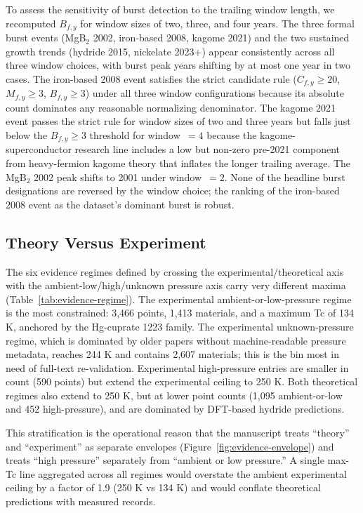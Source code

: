 \documentclass[11pt]{article}
\begin{document}
To assess the sensitivity of burst detection to the trailing window length, we recomputed $B_{f,y}$ for window sizes of two, three, and four years. The three formal burst events (MgB$_2$ 2002, iron-based 2008, kagome 2021) and the two sustained growth trends (hydride 2015, nickelate 2023+) appear consistently across all three window choices, with burst peak years shifting by at most one year in two cases. The iron-based 2008 event satisfies the strict candidate rule ($C_{f,y}\geq 20$, $M_{f,y}\geq 3$, $B_{f,y}\geq 3$) under all three window configurations because its absolute count dominates any reasonable normalizing denominator. The kagome 2021 event passes the strict rule for window sizes of two and three years but falls just below the $B_{f,y}\geq 3$ threshold for window~$=4$ because the kagome-superconductor research line includes a low but non-zero pre-2021 component from heavy-fermion kagome theory that inflates the longer trailing average. The MgB$_2$ 2002 peak shifts to 2001 under window~$=2$. None of the headline burst designations are reversed by the window choice; the ranking of the iron-based 2008 event as the dataset's dominant burst is robust.

\subsection{Theory Versus Experiment}
\label{subsec:theory-experiment}

The six evidence regimes defined by crossing the experimental/theoretical axis with the ambient-low/high/unknown pressure axis carry very different maxima (Table~\ref{tab:evidence-regime}). The experimental ambient-or-low-pressure regime is the most constrained: 3{,}466 points, 1{,}413 materials, and a maximum Tc of 134 K, anchored by the Hg-cuprate 1223 family. The experimental unknown-pressure regime, which is dominated by older papers without machine-readable pressure metadata, reaches 244 K and contains 2{,}607 materials; this is the bin most in need of full-text re-validation. Experimental high-pressure entries are smaller in count (590 points) but extend the experimental ceiling to 250 K. Both theoretical regimes also extend to 250 K, but at lower point counts (1{,}095 ambient-or-low and 452 high-pressure), and are dominated by DFT-based hydride predictions.

This stratification is the operational reason that the manuscript treats ``theory'' and ``experiment'' as separate envelopes (Figure~\ref{fig:evidence-envelope}) and treats ``high pressure'' separately from ``ambient or low pressure.'' A single max-Tc line aggregated across all regimes would overstate the ambient experimental ceiling by a factor of 1.9 (250 K vs 134 K) and would conflate theoretical predictions with measured records.
\end{document}
